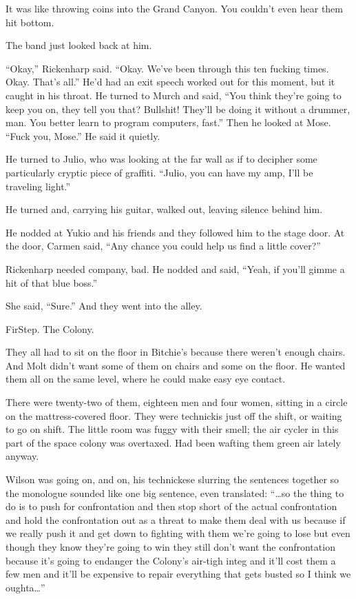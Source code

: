 It was like throwing coins into the Grand Canyon. You couldn't even hear them hit bottom.

The band just looked back at him.

``Okay,'' Rickenharp said. ``Okay. We've been through this ten fucking times. Okay. That's all.'' He'd had an exit speech worked out for this moment, but it caught in his throat. He turned to Murch and said, ``You think they're going to keep you on, they tell you that? Bullshit! They'll be doing it without a drummer, man. You better learn to program computers, fast.'' Then he looked at Mose. ``Fuck you, Mose.'' He said it quietly.

He turned to Julio, who was looking at the far wall as if to decipher some particularly cryptic piece of graffiti. ``Julio, you can have my amp, I'll be traveling light.''

He turned and, carrying his guitar, walked out, leaving silence behind him.

He nodded at Yukio and his friends and they followed him to the stage door. At the door, Carmen said, ``Any chance you could help us find a little cover?''

Rickenharp needed company, bad. He nodded and said, ``Yeah, if you'll gimme a hit of that blue boss.''

She said, ``Sure.'' And they went into the alley.

FirStep. The Colony.

They all had to sit on the floor in Bitchie's because there weren't enough chairs. And Molt didn't want some of them on chairs and some on the floor. He wanted them all on the same level, where he could make easy eye contact.

There were twenty-two of them, eighteen men and four women, sitting in a circle on the mattress-covered floor. They were technickis just off the shift, or waiting to go on shift. The little room was fuggy with their smell; the air cycler in this part of the space colony was overtaxed. Had been wafting them green air lately anyway.

Wilson was going on, and on, his technickese slurring the sentences together so the monologue sounded like one big sentence, even translated: ``\ldots so the thing to do is to push for confrontation and then stop short of the actual confrontation and hold the confrontation out as a threat to make them deal with us because if we really push it and get down to fighting with them we're going to lose but even though they know they're going to win they still don't want the confrontation because it's going to endanger the Colony's air-tigh integ and it'll cost them a few men and it'll be expensive to repair everything that gets busted so I think we oughta\ldots ''


